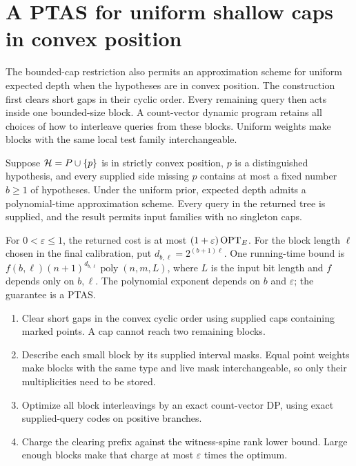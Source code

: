 \section{A PTAS for uniform shallow caps in convex position}
\label{sec:uniform-cap-ptas}

The bounded-cap restriction also permits an approximation scheme for
uniform expected depth when the hypotheses are in convex position.
The construction first clears short gaps in their cyclic order.
Every remaining query then acts inside one bounded-size block.
A count-vector dynamic program retains all choices of how to interleave
queries from these blocks. Uniform weights make blocks with the same
local test family interchangeable.

\begin{theorem}\label{thm:uniform-cap-ptas}
Suppose $\mathcal H=P\cup\{p\}$ is in strictly convex position, $p$ is a
distinguished hypothesis, and every supplied side missing $p$ contains
at most a fixed number $b\ge1$ of hypotheses. Under the uniform prior,
expected depth admits a polynomial-time approximation scheme. Every
query in the returned tree is supplied, and the result permits input
families with no singleton caps.

For $0<\varepsilon\le1$, the returned cost is at most
$(1+\varepsilon)\operatorname{OPT}_E$. For the block length $\ell$ chosen in the
final calibration, put
$d_{b,\ell}=2^{(b+1)\ell}$. One running-time bound is
$f(b,\ell)(n+1)^{d_{b,\ell}}\operatorname{poly}(n,m,L)$, where
$L$ is the input bit length and $f$ depends only on $b,\ell$.
The polynomial exponent depends on $b$ and $\varepsilon$; the
guarantee is a PTAS.
\end{theorem}

\begin{proofstrategy}
\begin{enumerate}
\item Clear short gaps in the convex cyclic order using supplied
caps containing marked points. A cap cannot reach two remaining blocks.
\item Describe each small block by its supplied interval masks.
Equal point weights make blocks with the same type and live mask
interchangeable, so only their multiplicities need to be stored.
\item Optimize all block interleavings by an exact count-vector DP,
using exact supplied-query codes on positive branches.
\item Charge the clearing prefix against the witness-spine rank
lower bound. Large enough blocks make that charge at most
$\varepsilon$ times the optimum.
\end{enumerate}
\end{proofstrategy}


